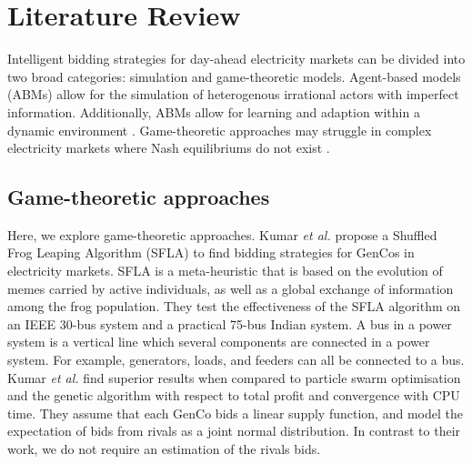 









\section{Literature Review}
\label{rl:sec:lit-review}

Intelligent bidding strategies for day-ahead electricity markets can be divided into two broad categories: simulation and game-theoretic models. Agent-based models (ABMs) allow for the simulation of heterogenous irrational actors with imperfect information. Additionally, ABMs allow for learning and adaption within a dynamic environment \cite{EsmaeiliAliabadi2017}. Game-theoretic approaches may struggle in complex electricity markets where Nash equilibriums do not exist \cite{Wang2011}.

\subsection{Game-theoretic approaches}

Here, we explore game-theoretic approaches. Kumar \textit{et al.} \cite{VijayaKumar2014} propose a Shuffled Frog Leaping Algorithm (SFLA) to find bidding strategies for GenCos in electricity markets. SFLA is a meta-heuristic that is based on the evolution of memes carried by active individuals, as well as a global exchange of information among the frog population. They test the effectiveness of the SFLA algorithm on an IEEE 30-bus system and a practical 75-bus Indian system. A bus in a power system is a vertical line which several components are connected in a power system. For example, generators, loads, and feeders can all be connected to a bus. Kumar \textit{et al.} find superior results when compared to particle swarm optimisation and the genetic algorithm with respect to total profit and convergence with CPU time. They assume that each GenCo bids a linear supply function, and model the expectation of bids from rivals as a joint normal distribution. In contrast to their work, we do not require an estimation of the rivals bids.

